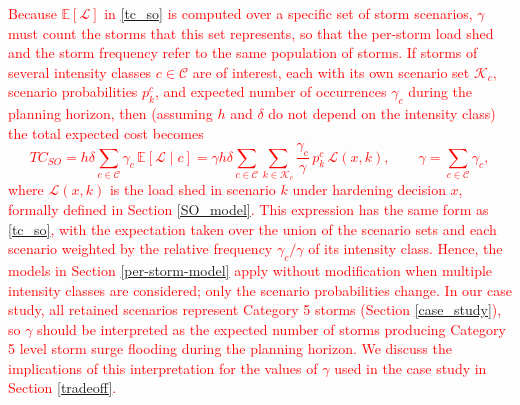 \documentclass[authoryear,preprint,review,12pt]{elsarticle}\usepackage{amssymb}
\begin{document}
\textcolor{red}{Because $\mathbb{E}[\mathcal{L}]$ in \eqref{tc_so} is computed over a specific set of storm scenarios, $\gamma$ must count the storms that this set represents, so that the per-storm load shed and the storm frequency refer to the same population of storms. If storms of several intensity classes $c \in \mathcal{C}$ are of interest, each with its own scenario set $\mathcal{K}_c$, scenario probabilities $p_k^c$, and expected number of occurrences $\gamma_c$ during the planning horizon, then (assuming $h$ and $\delta$ do not depend on the intensity class) the total expected cost becomes
\[
    TC_{SO} = h \delta \sum_{c \in \mathcal{C}} \gamma_c \, \mathbb{E}[\mathcal{L} \mid c] = \gamma h \delta \sum_{c \in \mathcal{C}} \sum_{k \in \mathcal{K}_c} \frac{\gamma_c}{\gamma} \, p_k^c \, \mathcal{L}(x,k), \qquad \gamma = \sum_{c \in \mathcal{C}} \gamma_c,
\]
where $\mathcal{L}(x,k)$ is the load shed in scenario $k$ under hardening decision $x$, formally defined in Section \ref{SO_model}. This expression has the same form as \eqref{tc_so}, with the expectation taken over the union of the scenario sets and each scenario weighted by the relative frequency $\gamma_c/\gamma$ of its intensity class. Hence, the models in Section \ref{per-storm-model} apply without modification when multiple intensity classes are considered; only the scenario probabilities change. In our case study, all retained scenarios represent Category 5 storms (Section \ref{case_study}), so $\gamma$ should be interpreted as the expected number of storms producing Category 5 level storm surge flooding during the planning horizon. We discuss the implications of this interpretation for the values of $\gamma$ used in the case study in Section \ref{tradeoff}.}
\end{document}
